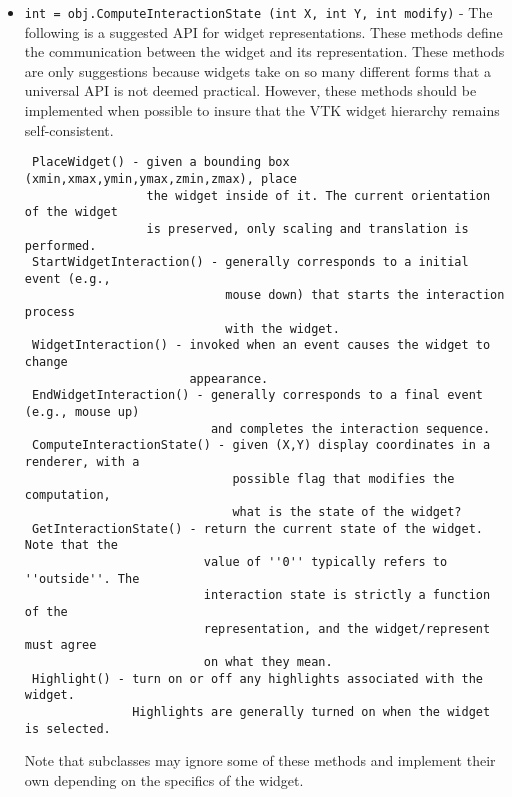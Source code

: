\begin{itemize}
\item  \verb|int = obj.ComputeInteractionState (int X, int Y, int modify)| -  The following is a suggested API for widget representations. These methods
 define the communication between the widget and its representation. These
 methods are only suggestions because widgets take on so many different
 forms that a universal API is not deemed practical. However, these methods
 should be implemented when possible to insure that the VTK widget hierarchy
 remains self-consistent.
 \begin{verbatim}
 PlaceWidget() - given a bounding box (xmin,xmax,ymin,ymax,zmin,zmax), place 
                 the widget inside of it. The current orientation of the widget 
                 is preserved, only scaling and translation is performed.
 StartWidgetInteraction() - generally corresponds to a initial event (e.g.,
                            mouse down) that starts the interaction process
                            with the widget.
 WidgetInteraction() - invoked when an event causes the widget to change 
                       appearance.
 EndWidgetInteraction() - generally corresponds to a final event (e.g., mouse up)
                          and completes the interaction sequence.
 ComputeInteractionState() - given (X,Y) display coordinates in a renderer, with a
                             possible flag that modifies the computation,
                             what is the state of the widget?
 GetInteractionState() - return the current state of the widget. Note that the
                         value of ''0'' typically refers to ''outside''. The 
                         interaction state is strictly a function of the
                         representation, and the widget/represent must agree
                         on what they mean.
 Highlight() - turn on or off any highlights associated with the widget.
               Highlights are generally turned on when the widget is selected.
 \end{verbatim}
 Note that subclasses may ignore some of these methods and implement their own
 depending on the specifics of the widget.


\end{itemize}
